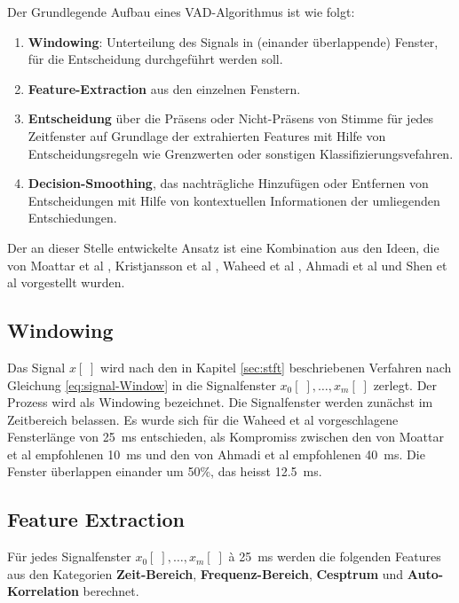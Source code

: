 Der Grundlegende Aufbau eines VAD-Algorithmus ist wie folgt:
\begin{enumerate}
	\item \textbf{Windowing}: Unterteilung des Signals in (einander überlappende) Fenster, für die Entscheidung durchgeführt werden soll.
	\item \textbf{Feature-Extraction} aus den einzelnen Fenstern.
	\item \textbf{Entscheidung} über die Präsens oder Nicht-Präsens von Stimme für jedes Zeitfenster auf Grundlage der extrahierten Features mit Hilfe von Entscheidungsregeln wie Grenzwerten oder sonstigen Klassifizierungsvefahren.
	\item \textbf{Decision-Smoothing}, das nachträgliche Hinzufügen oder Entfernen von Entscheidungen mit Hilfe von kontextuellen Informationen der umliegenden Entschiedungen.\cite[S. 8 - 9]{vad_granada} \cite[S. 1 - 2]{vad_kola}
\end{enumerate}

Der an dieser Stelle entwickelte Ansatz ist eine Kombination aus den Ideen, die von  Moattar et al \cite{vad_Easy}, Kristjansson et al \cite{vad_Lisboa}, Waheed et al \cite{vad_entropy}, Ahmadi et al \cite{vad_ceps} und Shen et al\cite{vad_entropie02} vorgestellt wurden. 

\subsection{Windowing}
\label{sec:windowing}

Das Signal $x[\;]$ wird nach den in Kapitel \ref{sec:stft} beschriebenen Verfahren nach Gleichung \ref{eq:signal-Window} in die Signalfenster $x_0[\;] , \ldots , x_m[\;]$ zerlegt. Der Prozess wird als \glqq Windowing\grqq{} bezeichnet. Die Signalfenster werden zunächst im Zeitbereich belassen. Es wurde sich für die Waheed et al \cite{vad_entropy} vorgeschlagene Fensterlänge von \SI{25}{\milli\second} entschieden, als Kompromiss zwischen den von Moattar et al\cite{vad_Easy} empfohlenen \SI{10}{\milli\second} und den von Ahmadi et al \cite{vad_ceps} empfohlenen \SI{40}{\milli\second}. Die Fenster überlappen einander um 50\%, das heisst \SI{12.5}{\milli\second}.

\subsection{Feature Extraction}
\label{sec:featExtraction}

Für jedes Signalfenster $x_0[\;] , \ldots , x_m[\;]$ à \SI{25}{\milli\second} werden die folgenden Features aus den Kategorien \textbf{Zeit-Bereich}, \textbf{Frequenz-Bereich}, \textbf{Cesptrum} und \textbf{Auto-Korrelation} berechnet.

